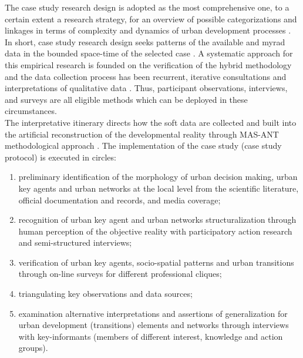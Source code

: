 \documentclass[11pt]{report}
\begin{document}
The case study research design is adopted as the most comprehensive one, to a certain extent a research strategy, for an overview of possible categorizations and linkages in terms of complexity and dynamics of urban development processes . In short, case study research design seeks patterns of the available and myrad data in the bounded space-time of the selected case . A systematic approach for this empirical research is founded on the verification of the hybrid methodology and the data collection process has been recurrent, iterative consultations and interpretations of qualitative data . Thus, participant observations, interviews,  and surveys are all eligible methods which can be deployed in these circumstances.
\\
The interpretative itinerary directs how the soft data are collected and built into the artificial reconstruction of the developmental reality through MAS-ANT methodological approach . The implementation of the case study (case study protocol) is executed in circles:
\begin{enumerate}
\item preliminary identification of the morphology of urban decision making, urban key agents and urban networks at the local level from the scientific literature, official documentation and records, and media coverage;
\item recognition of  urban key agent and urban networks structuralization through human perception of the objective reality with participatory action research and semi-structured interviews;
\item verification of urban key agents, socio-spatial patterns and urban transitions through on-line surveys for different professional cliques;
\item triangulating key observations and data sources;
\item examination  alternative interpretations and assertions of generalization for urban development (transitions) elements and networks through interviews with  key-informants (members of different interest, knowledge and action groups).
\end{enumerate}
\end{document}
